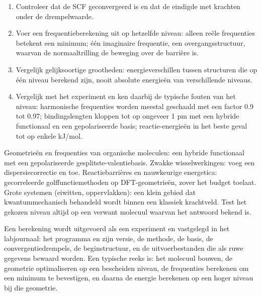 \begin{method}\label{met:b3:computational-chemistry:read-calculation}
\begin{enumerate}
  \item Controleer dat de SCF geconvergeerd is en dat de
         eindigde met krachten onder de drempelwaarde.
  \item Voer een frequentieberekening uit op hetzelfde niveau: alleen reële
        frequenties betekent een minimum; één imaginaire frequentie, een
        overgangsstructuur, waarvan de normaaltrilling de beweging over de
        barrière is.
  \item Vergelijk gelijksoortige grootheden: energieverschillen tussen
        structuren die op één niveau berekend zijn, nooit absolute
        energieën van verschillende niveaus.
  \item Vergelijk met het experiment en ken daarbij de typische fouten van
        het niveau: harmonische frequenties worden meestal geschaald met
        een factor 0.9 tot 0.97; bindingslengten kloppen tot op ongeveer
        1 pm met een hybride functionaal en een gepolariseerde basis;
        reactie-energieën in het beste geval tot op enkele \unit{kJ/mol}.
\end{enumerate}
\end{method}

\begin{method}\label{met:b3:computational-chemistry:choose-level}
Geometrieën en frequenties van organische moleculen: een hybride
functionaal met een gepolariseerde gesplitste-valentiebasis. Zwakke
wisselwerkingen: voeg een dispersiecorrectie en  toe.
Reactiebarrières en nauwkeurige energetica: gecorreleerde
golffunctiemethoden op DFT-geometrieën, zover het budget toelaat. Grote
systemen (eiwitten, oppervlakken): een klein gebied dat
kwantummechanisch behandeld wordt binnen een klassiek krachtveld. Test het
gekozen niveau altijd op een verwant molecuul waarvan het antwoord bekend
is.
\end{method}

\begin{inthelab}
Een berekening wordt uitgevoerd als een experiment en vastgelegd in het
labjournaal: het programma en zijn versie, de methode, de basis, de
convergentiedrempels, de beginstructuur, en de uitvoerbestanden die als
ruwe gegevens bewaard worden. Een typische reeks is: het molecuul bouwen,
de geometrie optimaliseren op een bescheiden niveau, de frequenties
berekenen om een minimum te bevestigen, en daarna de energie berekenen op
een hoger niveau bij die geometrie.
\end{inthelab}

